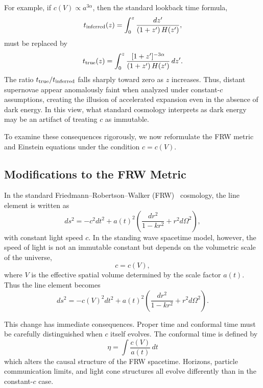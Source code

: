 \documentclass[12pt]{article}
\begin{document}
For example, if $c(V) \propto a^{3\alpha}$, then the standard lookback time formula,
\begin{equation}
t_{\rm inferred}(z) = \int_0^z \frac{dz'}{(1+z')\, H(z')},
\end{equation}
must be replaced by
\begin{equation}
t_{\rm true}(z) = \int_0^z \frac{[1+z']^{-3\alpha}}{(1+z')\, H(z')} \, dz' .
\end{equation}
The ratio $t_{\rm true}/t_{\rm inferred}$ falls sharply toward zero as $z$ increases.  
Thus, distant supernovae appear anomalously faint when analyzed under constant-$c$ assumptions, creating the illusion of accelerated expansion even in the absence of dark energy.  
In this view, what standard cosmology interprets as dark energy may be an artifact of treating $c$ as immutable.  

\medskip
To examine these consequences rigorously, we now reformulate the FRW metric and Einstein equations under the condition $c = c(V)$.

\subsection{Modifications to the FRW Metric}

In the standard Friedmann–Robertson–Walker (FRW)~\cite{frw} cosmology, the line element is written as
\begin{equation}
  ds^2 = -c^2 dt^2 + a(t)^2 \left( \frac{dr^2}{1 - k r^2} + r^2 d\Omega^2 \right),
\end{equation}
with constant light speed \(c\). In the standing wave spacetime model, however, the speed of light is not an immutable constant but depends on the volumetric scale of the universe,
\begin{equation}
  c = c(V),
\end{equation}
where \(V\) is the effective spatial volume determined by the scale factor \(a(t)\). Thus the line element becomes
\begin{equation}
  ds^2 = -c(V)^2 dt^2 + a(t)^2 \left( \frac{dr^2}{1 - k r^2} + r^2 d\Omega^2 \right).
\end{equation}

This change has immediate consequences. Proper time and conformal time must be carefully distinguished when \(c\) itself evolves. The conformal time is defined by
\begin{equation}
\eta = \int \frac{c(V)}{a(t)} \, dt
\label{eq:frw_conformal_time}
\end{equation}
which alters the causal structure of the FRW spacetime. Horizons, particle communication limits, and light cone structures all evolve differently than in the constant-\(c\) case.
\end{document}
